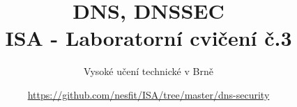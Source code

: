 \documentclass[a4paper,11pt]{article}
\title{DNS, DNSSEC\\
{\bf\large ISA - Laboratorní cvičení č.3}}
\author{Vysoké učení technické v Brně}
\date{\url{https://github.com/nesfit/ISA/tree/master/dns-security}}
\begin{document}
{\let\newpage\relax\maketitle}


\end{document}
